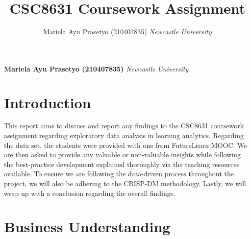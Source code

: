 \documentclass[12pt,]{article}
\title{CSC8631 Coursework Assignment  }
\author{\Large Mariela Ayu Prasetyo
(210407835)\vspace{0.05in} \newline\normalsize\emph{Newcastle
University}  }
\date{}
\newcommand*{\authorfont}{\fontfamily{phv}\selectfont}
\begin{document}
	
%    


{%
\setlength{\parindent}{0pt}
\thispagestyle{plain}
{\fontsize{18}{20}\selectfont\raggedright 
\maketitle  %

}

{
   \vskip 13.5pt\relax \normalsize\fontsize{11}{12} 
\textbf{\authorfont Mariela Ayu Prasetyo
(210407835)} \hskip 15pt \emph{\small Newcastle University}   

}

}






\vskip -8.5pt



\noindent  

\hypertarget{introduction}{%
\section{Introduction}\label{introduction}}

This report aims to discuss and report any findings to the CSC8631
coursework assignment regarding exploratory data analysis in learning
analytics. Regarding the data set, the students were provided with one
from FutureLearn MOOC. We are then asked to provide any valuable or
non-valuable insights while following the best-practice development
explained thoroughly via the teaching resources available. To ensure we
are following the data-driven process throughout the project, we will
also be adhering to the CRISP-DM methodology. Lastly, we will wrap up
with a conclusion regarding the overall findings.

\hypertarget{business-understanding}{%
\section{Business Understanding}\label{business-understanding}}
\end{document}
